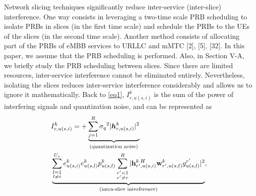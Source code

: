 \documentclass[12pt, letterpaper]{article}
\begin{document}
Network slicing techniques significantly reduce inter-service (inter-slice) interference.
One way consists in leveraging a two-time scale PRB scheduling to isolate PRBs in slices (in the first time scale) and schedule the PRBs to the UEs of the slices (in the second time scale). Another method consists of allocating part of the PRBs of eMBB services to URLLC and mMTC [2], [5], [32]. In this paper, we assume that the PRB scheduling is performed. Also, in Section V-A, we briefly study the PRB scheduling between slices.
Since there are limited resources, inter-service interference cannot be eliminated entirely. Nevertheless, isolating the slices reduces inter-service interference considerably and allows us to ignore it mathematically.
Back to \eqref{eq1}, $I_{r,u(s,i)}^{k}$ is the sum of the power of interfering signals and quantization noise, and can be represented as 
\begin{align}\label{eqI}
&I_{r,u(s,i)}^{k} =+\underbrace{  \sum_{j=1}^{{R}} {\sigma_q}^2 |\boldsymbol{h}_{r,{u(s,i)}}^k|^2 }_{\text{(quantization noise)}}\nonumber\\
 &\underbrace{\sum_{\substack{l=1 \\ l\neq i}}^{{U}_{s}} e^{k}_{u(s,i)}e^{k}_{u(s,l)}  p_{u(s,l)}^{k}\sum_{\substack{r'=1 \\ r'\neq r}}^{R}|{\bold{h}_{r',u(s,i)}^{k \: H}} \bold{w}_{r',u(s,l)}^{k} g_{u(s,l)}^{r'}|^2}_{\text{(intra-slice interference)}},
\end{align}
\end{document}
